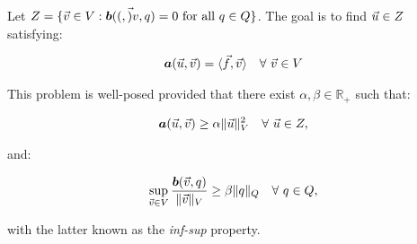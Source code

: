 Let $Z = \{\vec{v} \in V: \bm{b}((, \vec{)}{v}, q) = 0 \text{ for all } q \in Q\}$. The goal is to find $\vec{u} \in Z$ satisfying:

\begin{gather} \label{kernel_stokes}
    \bm{a}(\vec{u}, \vec{v}) = \langle \vec{f}, \vec{v} \rangle \quad \forall ~ \vec{v} \in V
\end{gather}

This problem is well-posed provided that there exist $\alpha, \beta \in \mathbb{R}_+$ such that:

\begin{gather} \label{coercivity}
    \bm{a}(\vec{u}, \vec{v}) \geq \alpha \lVert \vec{u} \rVert^2_V \quad \forall ~ \vec{u} \in Z,
\end{gather}

and:

\begin{gather} \label{inf-sup}
    \sup_{\vec{v} \in V} \frac{\bm{b}(\vec{v}, q)}{\lVert \vec{v} \rVert_V} \geq \beta \lVert q \rVert_Q \quad \forall ~ q \in Q,
\end{gather}

with the latter known as the \textit{inf-sup} property.